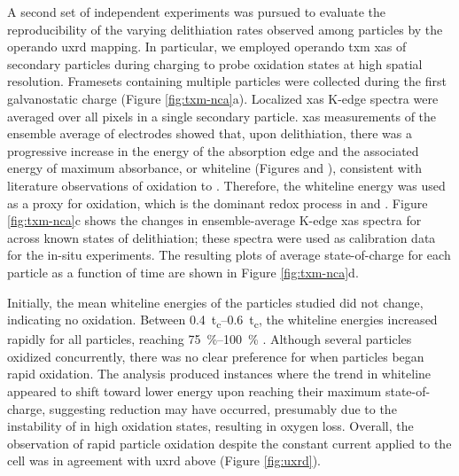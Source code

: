 \documentclass{article}
\begin{document}


A second set of independent experiments was pursued to evaluate the
reproducibility of the varying delithiation rates observed among
particles by the operando \gls{uxrd} mapping. In particular, we
employed operando \Gls{txm} \gls{xas} of \nca{} secondary particles
during charging to probe  oxidation states at high spatial
resolution. Framesets containing multiple particles were collected
during the first galvanostatic charge (Figure
\ref{fig:txm-nca}a). Localized \gls{xas} K-edge spectra were averaged
over all pixels in a single secondary particle. \gls{xas} measurements
of the ensemble average of electrodes showed that, upon delithiation,
there was a progressive increase in the energy of the absorption edge
and the associated energy of maximum absorbance, or whiteline (Figures
 and ), consistent
with literature observations of  oxidation to
\cite{deb2005,muto2009}. Therefore, the whiteline energy
was used as a proxy for  oxidation, which is the dominant redox
process in \nca{} and \nmc{}. Figure \ref{fig:txm-nca}c shows the
changes in ensemble-average  K-edge \gls{xas} spectra for
\nca{} across known states of delithiation; these spectra were used as
calibration data for the in-situ experiments. The resulting plots of
average state-of-charge for each particle as a function of time are
shown in Figure \ref{fig:txm-nca}d.

Initially, the mean whiteline energies of the particles studied did
not change, indicating no  oxidation. Between
\SIrange{0.4}{0.6}{t_c}, the whiteline energies increased rapidly for
all particles, reaching \SIrange{75}{100}{\percent} . Although several particles oxidized
concurrently, there was no clear preference for when particles began
rapid oxidation. The analysis produced instances where the trend in
whiteline appeared to shift toward lower energy upon reaching their
maximum state-of-charge, suggesting  reduction may have
occurred, presumably due to the instability of  in high
oxidation states\cite{myung2020-2}, resulting in oxygen loss. Overall,
the observation of rapid particle oxidation despite the constant
current applied to the cell was in agreement with \gls{uxrd} above
(Figure \ref{fig:uxrd}).
\end{document}
